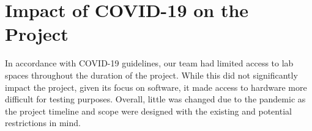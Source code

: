 \section{Impact of COVID-19 on the Project}

In accordance with COVID-19 guidelines, our team had limited access to lab spaces throughout the duration of the project. While this did not significantly impact the project, given its focus on software, it made access to hardware more difficult for testing purposes. Overall, little was changed due to the pandemic as the project timeline and scope were designed with the existing and potential restrictions in mind.